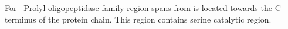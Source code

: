 For~ Prolyl oligopeptidase family region spans from is located towards the C-terminus of the protein chain. This region contains serine catalytic region.  